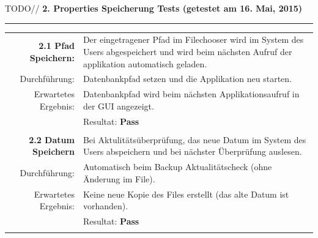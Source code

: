 \documentclass{article}
\begin{document}
\vspace{1cm}
TODO//
\textbf{2. Properties Speicherung Tests (getestet am 16. Mai, 2015)\\}
\rule[2mm]{1\linewidth}{0.3mm}
\begin{tabular}{r|p{12cm}}
	\textbf{2.1 Pfad Speichern:} & Der eingetragener Pfad im Filechooser wird im System des Users abgespeichert und wird beim nächsten Aufruf der applikation automatisch geladen.\\
	Durchführung:			& Datenbankpfad setzen und die Applikation neu starten.\\
	Erwartetes Ergebnis: 	& Datenbankpfad wird beim nächsten Applikationsaufruf in der GUI angezeigt. \\
	& Resultat:  \textbf{Pass}\hspace{9cm} \color{green} {\ding{51}} \\
	\\	
	
	\textbf{2.2 Datum Speichern } & Bei Aktulitätsüberprüfung, das neue Datum im System des Users abspeichern und bei nächster Überprüfung auslesen. \\
	Durchführung:			& Automatisch beim Backup Aktualitätscheck (ohne Änderung im File).\\
	Erwartetes Ergebnis: 	& Keine neue Kopie des Files erstellt (das alte Datum ist vorhanden). \\
	& Resultat:  \textbf{Pass}\hspace{9cm} \color{green} {\ding{51}} \\
	\\	
\end{tabular}

\newpage
\end{document}
